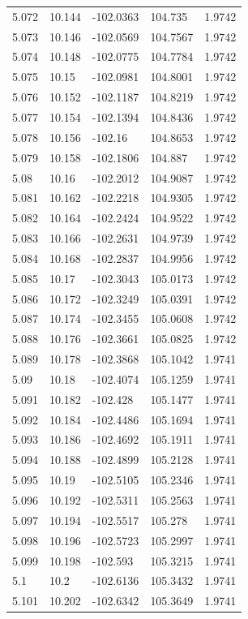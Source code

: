 \begin{tabular}{lllll}
5.072 & 10.144 & -102.0363 & 104.735 & 1.9742 \\
5.073 & 10.146 & -102.0569 & 104.7567 & 1.9742 \\
5.074 & 10.148 & -102.0775 & 104.7784 & 1.9742 \\
5.075 & 10.15 & -102.0981 & 104.8001 & 1.9742 \\
5.076 & 10.152 & -102.1187 & 104.8219 & 1.9742 \\
5.077 & 10.154 & -102.1394 & 104.8436 & 1.9742 \\
5.078 & 10.156 & -102.16 & 104.8653 & 1.9742 \\
5.079 & 10.158 & -102.1806 & 104.887 & 1.9742 \\
5.08 & 10.16 & -102.2012 & 104.9087 & 1.9742 \\
5.081 & 10.162 & -102.2218 & 104.9305 & 1.9742 \\
5.082 & 10.164 & -102.2424 & 104.9522 & 1.9742 \\
5.083 & 10.166 & -102.2631 & 104.9739 & 1.9742 \\
5.084 & 10.168 & -102.2837 & 104.9956 & 1.9742 \\
5.085 & 10.17 & -102.3043 & 105.0173 & 1.9742 \\
5.086 & 10.172 & -102.3249 & 105.0391 & 1.9742 \\
5.087 & 10.174 & -102.3455 & 105.0608 & 1.9742 \\
5.088 & 10.176 & -102.3661 & 105.0825 & 1.9742 \\
5.089 & 10.178 & -102.3868 & 105.1042 & 1.9741 \\
5.09 & 10.18 & -102.4074 & 105.1259 & 1.9741 \\
5.091 & 10.182 & -102.428 & 105.1477 & 1.9741 \\
5.092 & 10.184 & -102.4486 & 105.1694 & 1.9741 \\
5.093 & 10.186 & -102.4692 & 105.1911 & 1.9741 \\
5.094 & 10.188 & -102.4899 & 105.2128 & 1.9741 \\
5.095 & 10.19 & -102.5105 & 105.2346 & 1.9741 \\
5.096 & 10.192 & -102.5311 & 105.2563 & 1.9741 \\
5.097 & 10.194 & -102.5517 & 105.278 & 1.9741 \\
5.098 & 10.196 & -102.5723 & 105.2997 & 1.9741 \\
5.099 & 10.198 & -102.593 & 105.3215 & 1.9741 \\
5.1 & 10.2 & -102.6136 & 105.3432 & 1.9741 \\
5.101 & 10.202 & -102.6342 & 105.3649 & 1.9741 \\

\end{tabular}
